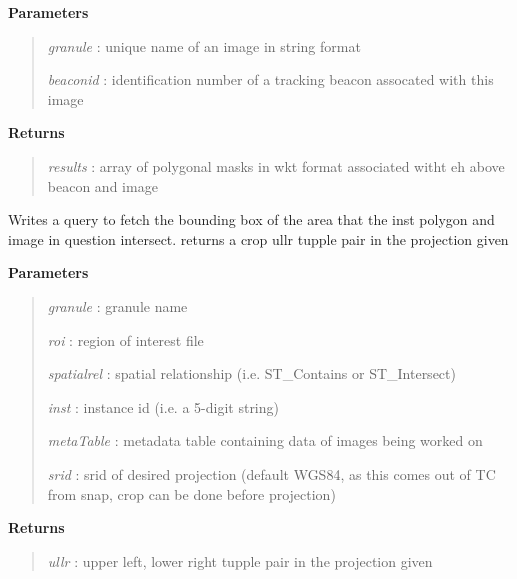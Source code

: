\documentclass[letterpaper,10pt,openany,oneside]{sphinxmanual}
\begin{document}
\begin{fulllineitems}
\begin{fulllineitems}
\label{code:Database.Database.polarimetricDonuts}
\textbf{Parameters}
\begin{quote}

\emph{granule} : unique name of an image in string format

\emph{beaconid} : identification number of a tracking beacon assocated with this image
\end{quote}

\textbf{Returns}
\begin{quote}

\emph{results} : array of polygonal masks in wkt format associated witht eh above beacon and image
\end{quote}

\end{fulllineitems}


\begin{fulllineitems}
\label{code:Database.Database.qryCropZone}
Writes a query to fetch the bounding box of the area that the inst polygon and
image in question intersect.
returns a crop ullr tupple pair in the projection given

\textbf{Parameters}
\begin{quote}

\emph{granule}    : granule name

\emph{roi}        : region of interest file

\emph{spatialrel} : spatial relationship (i.e. ST\_Contains or ST\_Intersect)

\emph{inst}       : instance id (i.e. a 5-digit string)

\emph{metaTable}  : metadata table containing data of images being worked on

\emph{srid}       : srid of desired projection (default WGS84, as this comes out of TC from snap, crop can be done before projection)
\end{quote}

\textbf{Returns}
\begin{quote}

\emph{ullr}       : upper left, lower right tupple pair in the projection given
\end{quote}


\end{fulllineitems}
\end{fulllineitems}
\end{document}
